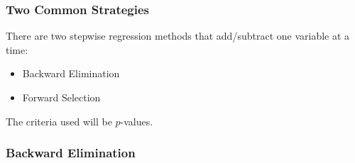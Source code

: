 \documentclass[handout]{beamer}
\newcommand{\blue}[1]{\textcolor{blue2}{#1}}
\begin{document}
\begin{frame}[fragile]
\frametitle{Two Common Strategies}

There are two \blue{stepwise regression} methods that add/subtract one variable at a time:
\begin{itemize}
\item Backward Elimination
\item Forward Selection
\end{itemize}

\pause
\vspace{0.5cm}

The criteria used will be $p$-values.  

\end{frame}


\begin{frame}[fragile]
\frametitle{Backward Elimination}

%
%

\end{frame}
\end{document}
